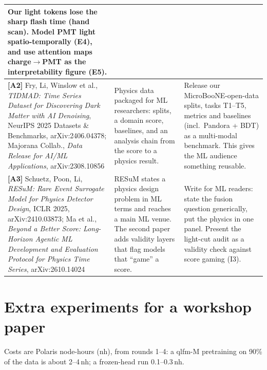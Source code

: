 \documentclass[11pt,a4paper]{article}
\begin{document}
\begin{table}[H]
\begin{tabularx}{\textwidth}{>{\raggedright\arraybackslash}p{4.3cm}LL}
Our light tokens lose the sharp flash time (hand scan). Model PMT light spatio-temporally (E4), and use attention maps charge$\to$PMT as the interpretability figure (E5).\\\midrule
\textbf{[A2]} Fry, Li, Winslow et al., \emph{TIDMAD: Time Series Dataset for Discovering Dark Matter with AI Denoising}, NeurIPS 2025 Datasets \& Benchmarks, arXiv:2406.04378; Majorana Collab., \emph{Data Release for AI/ML Applications}, arXiv:2308.10856 &
Physics data packaged for ML researchers: splits, a domain score, baselines, and an analysis chain from the score to a physics result. &
Release our MicroBooNE-open-data splits, tasks T1--T5, metrics and baselines (incl.\ Pandora + BDT) as a multi-modal benchmark. This gives the ML audience something reusable.\\\midrule
\textbf{[A3]} Schuetz, Poon, Li, \emph{RESuM: Rare Event Surrogate Model for Physics Detector Design}, ICLR 2025, arXiv:2410.03873; Ma et al., \emph{Beyond a Better Score: Long-Horizon Agentic ML Development and Evaluation Protocol for Physics Time Series}, arXiv:2610.14024 &
RESuM states a physics design problem in ML terms and reaches a main ML venue. The second paper adds validity layers that flag models that ``game'' a score. &
Write for ML readers: state the fusion question generically, put the physics in one panel. Present the light-cut audit as a validity check against score gaming (I3).\\
\bottomrule\end{tabularx}
\end{table}

\section{Extra experiments for a workshop paper}\label{sec:exp}

Costs are Polaris node-hours (nh), from rounds 1--4: a qlfm-M pretraining on 90\% of the data is about 2--4\,nh; a frozen-head run 0.1--0.3\,nh.
\end{document}

